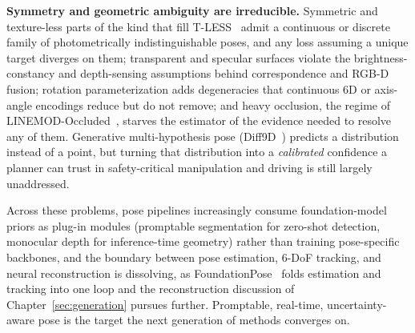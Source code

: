 \textbf{Symmetry and geometric ambiguity are irreducible.}
Symmetric and texture-less parts of the kind that fill T-LESS~\cite{Hodan2017TLESS} admit a continuous or discrete family of photometrically indistinguishable poses, and any loss assuming a unique target diverges on them; transparent and specular surfaces violate the brightness-constancy and depth-sensing assumptions behind correspondence and RGB-D fusion; rotation parameterization adds degeneracies that continuous 6D or axis-angle encodings reduce but do not remove; and heavy occlusion, the regime of LINEMOD-Occluded~\cite{brachmann2014lmo}, starves the estimator of the evidence needed to resolve any of them.
Generative multi-hypothesis pose (Diff9D~\cite{liu2024diff9d}) predicts a distribution instead of a point, but turning that distribution into a \emph{calibrated} confidence a planner can trust in safety-critical manipulation and driving is still largely unaddressed.

Across these problems, pose pipelines increasingly consume foundation-model priors as plug-in modules (promptable segmentation for zero-shot detection, monocular depth for inference-time geometry) rather than training pose-specific backbones, and the boundary between pose estimation, 6-DoF tracking, and neural reconstruction is dissolving, as FoundationPose~\cite{wen2024foundationpose} folds estimation and tracking into one loop and the reconstruction discussion of Chapter~\ref{sec:generation} pursues further. Promptable, real-time, uncertainty-aware pose is the target the next generation of methods converges on.

